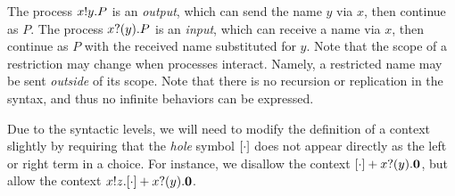 The process \( x ! y . P \) is an \emph{output}, which can send the name \( y \) via \( x \), then continue as \( P \).
The process \( x ? (y) . P \) is an \emph{input}, which can receive a name via \( x \), then continue as \( P \) with the received name substituted for \( y \).
Note that the scope of a restriction may change when processes interact. Namely, a restricted name may be sent \emph{outside} of its scope.
Note that there is no recursion or replication in the syntax, and thus no infinite behaviors can be expressed.




Due to the syntactic levels, we will need to modify the definition of a context slightly by requiring that the \emph{hole} symbol \( [\cdot] \) does not appear directly as the left or right term in a choice.
For instance, we disallow the context \( [\cdot] + x ? (y) . \bm{0} \), but allow the context \( x ! z . [\cdot] + x ? (y) . \bm{0} \).

